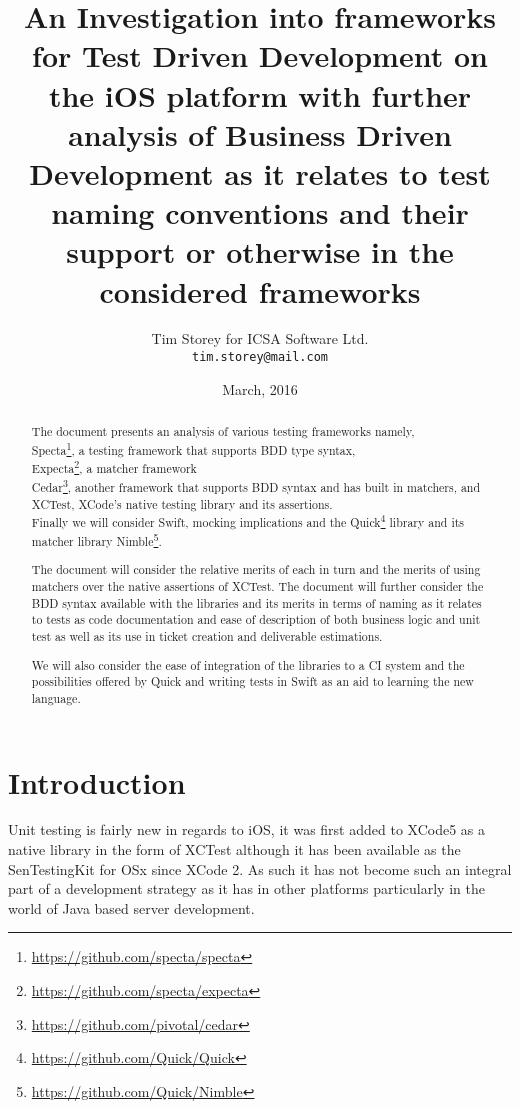 \documentclass[a4paper, titlepage]{article}
\title{An Investigation into frameworks for Test Driven
Development on the iOS platform with further
analysis of Business Driven Development as it relates to test naming
conventions and their support or otherwise in the considered frameworks}
\author{Tim Storey \hfill for \hfill ICSA Software Ltd.
        \\\texttt{tim.storey@mail.com}}
\date{March, 2016}
\begin{document}
\maketitle

\begin{abstract}
  The document presents an analysis of various testing frameworks
  namely,
  \\Specta\footnote{\url{https://github.com/specta/specta}}, a testing
  framework that supports BDD type syntax,
  \\Expecta\footnote{\url{https://github.com/specta/expecta}}, a matcher
  framework 
  \\Cedar\footnote{\url{https://github.com/pivotal/cedar}}, another
  framework that supports BDD syntax and has built in matchers, and XCTest, XCode's native testing library and its
  assertions.
  \\Finally we will consider Swift, mocking implications and the
  Quick\footnote{\url{https://github.com/Quick/Quick}}
  library and its matcher library Nimble\footnote{\url{https://github.com/Quick/Nimble}}. 

  The document will consider the relative merits of each in
  turn and the merits of using matchers over the native assertions of
  XCTest. The document will further consider the  BDD syntax available with the
  libraries and its merits in terms of naming as it relates to tests as code documentation
  and ease of description of both business logic and unit test as well
  as its use in ticket creation and deliverable estimations.
  
  We will also consider the ease of integration of the 
  libraries to a CI system and the possibilities offered by Quick and
  writing tests in Swift as an aid to learning the new language.
  \end{abstract}

{\hypersetup{linkcolor=black} \tableofcontents } 
\newpage

\section{Introduction}
  \label{sec:Intro}
  Unit testing is fairly new in regards to iOS, it was first added to
  XCode5 as a native library in the form of XCTest although it has been available
  as the SenTestingKit for OSx since XCode 2. As such it has not become such an
  integral part of a development strategy as it has in other
  platforms particularly in the world of Java based server development.
\end{document}
